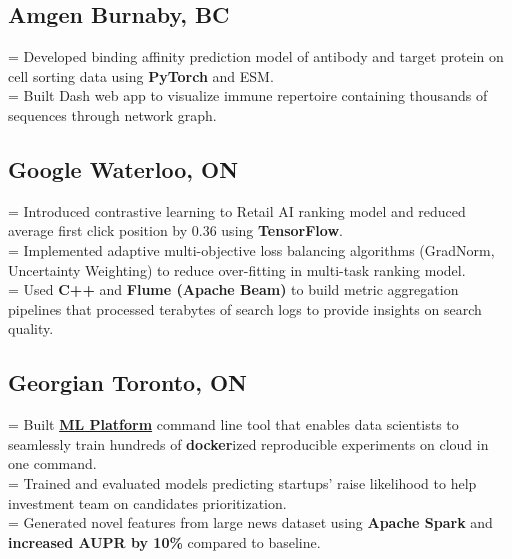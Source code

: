 \documentclass[]{Keval-resume}
\newlength\boxwid%
\let\oldtextbullet=\textbullet
\def\textbullet{%
    \settowidth{\boxwid}{\indent\oldtextbullet\ }%
    \hangindent=\boxwid%
    \oldtextbullet}
\begin{document}
\subsection{{Amgen} \hfill \normalfont Burnaby, BC}
\textbullet{} Developed binding affinity prediction model of antibody and target protein on cell sorting data using \textbf{PyTorch} and ESM. \\
\textbullet{} Built Dash web app to visualize immune repertoire containing thousands of sequences through network graph. \\ 
\sectionsep

\subsection{{Google} \hfill \normalfont Waterloo, ON}
\textbullet{} Introduced contrastive learning to Retail AI ranking model and reduced average first click position by 0.36 using \textbf{TensorFlow}. \\
\textbullet{} Implemented adaptive multi-objective loss balancing algorithms (GradNorm, Uncertainty Weighting) to reduce over-fitting in multi-task ranking model. \\
\textbullet{} Used \textbf{C++} and \textbf{Flume (Apache Beam)} to build metric aggregation pipelines that processed terabytes of search logs to provide insights on search quality. 
\sectionsep

\subsection{{Georgian} \hfill \normalfont Toronto, ON}
\textbullet{} Built \href{https://github.com/georgianpartners/hydra}{\textbf{ML Platform}} command line tool that enables data scientists to seamlessly train hundreds of \textbf{docker}ized reproducible experiments on cloud in one command.  \\
\textbullet{} Trained and evaluated models predicting startups' raise likelihood to help investment team on candidates prioritization. \\ %
\textbullet{} Generated novel features from large news dataset using \textbf{Apache Spark} and \textbf{increased AUPR by 10\%} compared to baseline.\\
\sectionsep
\end{document}
